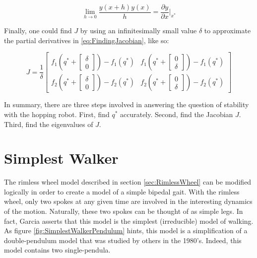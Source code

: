 \begin{equation}
\lim_{h \to 0} \frac{y(x+h)y(x)}{h}=\frac{\partial y}{\partial x}\bigg|_{x^{*}}
\label{eq:FindingJacobian}
\end{equation}

Finally, one could find $J$ by using an infinitesimally small value $\delta$ to approximate the partial derivatives in \ref{eq:FindingJacobian}, like so: 

\begin{equation}
J= \frac{1}{\delta}
\begin{bmatrix}
f_{1}\left(q^{*}+\begin{bmatrix} \delta \\ 0 \end{bmatrix}\right) - f_{1}(q^{*}) & f_{1}\left(q^{*}+\begin{bmatrix} 0 \\ \delta \end{bmatrix}\right) - f_{1}(q^{*}) \\[3mm]
f_{2}\left(q^{*}+\begin{bmatrix} \delta \\ 0 \end{bmatrix}\right) - f_{2}(q^{*}) & f_{2}\left(q^{*}+\begin{bmatrix} 0 \\ \delta \end{bmatrix}\right) - f_{2}(q^{*})
\end{bmatrix}
\label{eq:FindingQStar}
\end{equation}

In summary, there are three steps involved in answering the question of stability with the hopping robot. First, find $q^*$ accurately. Second, find the Jacobian $J$. Third, find the eigenvalues of $J$.


\section{Simplest Walker} %
\label{sec:SimplestWalker}



The rimless wheel model described in section \ref{sec:RimlessWheel} can be modified logically in order to create a model of a simple bipedal gait. With the rimless wheel, only two spokes at any given time are involved in the interesting dynamics of the motion. Naturally, these two spokes can be thought of as simple legs. In fact, Garcia \cite{garcia97} asserts that this model is the simplest (irreducible) model of walking. As figure \ref{fig:SimplestWalkerPendulum} hints, this model is a simplification of a double-pendulum model that was studied by 
others in the 1980's. Indeed, this model contains two single-pendula.

